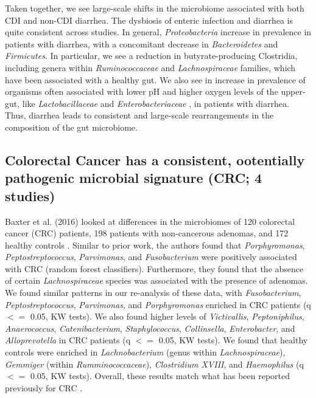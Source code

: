 {Taken together, we see large-scale shifts in the microbiome associated with both CDI and non-CDI diarrhea.
The dysbiosis of enteric infection and diarrhea is quite consistent across studies.
In general, \textit{Proteobacteria} increase in prevalence in patients with diarrhea, with a concomitant decrease in \textit{Bacteroidetes} and \textit{Firmicutes}.
In particular, we see a reduction in butyrate-producing Clostridia, including genera within \textit{Ruminococcaceae} and \textit{Lachnospiraceae} families, which have been associated with a healthy gut.
We also see in increase in prevalence of organisms often associated with lower pH and higher oxygen levels of the upper-gut, like \textit{Lactobacillaceae} and \textit{Enterobacteriaceae} \cite{donaldson2016gut}, in patients with diarrhea.
Thus, diarrhea leads to consistent and large-scale rearrangements in the composition of the gut microbiome.

\subsection*{Colorectal Cancer has a consistent, ootentially pathogenic microbial signature (CRC; 4 studies)}

Baxter et al. (2016) looked at differences in the microbiomes of 120 colorectal cancer (CRC) patients, 198 patients with non-cancerous adenomas, and 172 healthy controls \cite{crc-baxter}.
Similar to prior work, the authors found that \textit{Porphyromonas}, \textit{Peptostreptococcus}, \textit{Parvimonas}, and \textit{Fusobacterium} were positively associated with CRC (random forest classifiers).
Furthermore, they found that the absence of certain \textit{Lachnospiraceae} species was associated with the presence of adenomas.
We found similar patterns in our re-analysis of these data, with \textit{Fusobacterium}, \textit{Peptostreptococcus}, \textit{Parvimonas}, and \textit{Porphyromonas} enriched in CRC patients (q $<=$ 0.05, KW tests).
We also found higher levels of \textit{Victivallis}, \textit{Peptoniphilus}, \textit{Anaerococcus}, \textit{Catenibacterium}, \textit{Staphylococcus}, \textit{Collinsella}, \textit{Enterobacter}, and \textit{Alloprevotella} in CRC patients (q $<=$ 0.05, KW tests).
We found that healthy controls were enriched in \textit{Lachnobacterium} (genus within \textit{Lachnospiraceae}), \textit{Gemmiger} (within \textit{Rumminococcaceae}), \textit{Clostridium XVIII}, and \textit{Haemophilus} (q $<=$ 0.05, KW tests).
Overall, these results match what has been reported previously for CRC \cite{brennan2016gut}.

}
